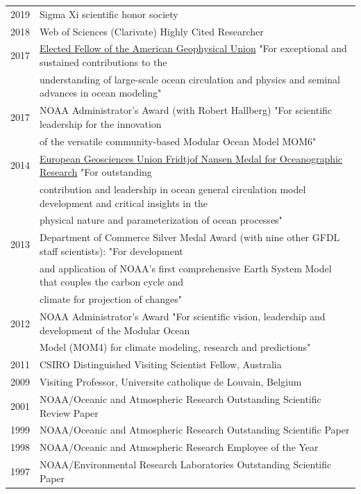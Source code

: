\documentclass{article}
\begin{document}
\begin{tabular}{ll}
  2019 & Sigma Xi scientific honor society 
  \\
  2018 & Web of Sciences (Clarivate) Highly Cited Researcher 
  \\
  2017 & \href{https://eos.org/agu-news/celebrating-the-2017-class-of-fellows}{Elected Fellow of the American Geophysical Union} "For exceptional and sustained contributions to the \\ &  understanding of large-scale ocean circulation and physics and seminal advances in ocean modeling"
\\
  2017 & NOAA Administrator's Award (with Robert Hallberg) "For scientific leadership for the innovation \\ & of the versatile  community-based Modular Ocean Model MOM6" 
  \\
  2014 & \href{http://www.egu.eu/awards-medals/fridtjof-nansen/2014/stephen-m-griffies/}{European Geosciences Union Fridtjof Nansen Medal for
         Oceanographic Research}  "For 
outstanding \\ & contribution and leadership in 
ocean general circulation model development 
and critical insights in the \\ & physical 
nature and parameterization of ocean processes"
\\
  2013 & Department of Commerce Silver Medal Award (with nine other
  GFDL staff scientists): 
  "For development \\ & and application of NOAA's first comprehensive  
  Earth System Model  
  that couples the carbon cycle and \\ & climate for projection of changes" \\
  2012 & NOAA Administrator's Award "For scientific vision, leadership
  and development of 
  the Modular Ocean \\ & Model (MOM4) for climate modeling, research and
  predictions" \\
  2011 & CSIRO Distinguished Visiting Scientist Fellow, Australia \\
  2009 & Visiting Professor, Universite catholique de Louvain, Belgium\\
  2001 & NOAA/Oceanic and Atmospheric Research Outstanding Scientific
  Review Paper\\
  1999 & NOAA/Oceanic and Atmospheric Research Outstanding Scientific Paper\\
  1998 & NOAA/Oceanic and Atmospheric Research Employee of the Year\\
  1997 & NOAA/Environmental Research Laboratories Outstanding Scientific Paper\\
\end{tabular}
\end{document}
